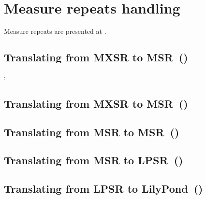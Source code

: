 
\chapter{Measure repeats handling}\label{Measure repeats handling}

Measure repeats are presented at .


\section{Translating from MXSR to MSR\ (\mxsrToMsr{})}

:


\section{Translating from MXSR to MSR\ (\mxsrToMsr{})}


\section{Translating from MSR to MSR\ (\msrToMsr{})}


\section{Translating from MSR to LPSR\ (\msrToLpsr{})}


\section{Translating from LPSR to LilyPond\ (\lpsrToLilypond{})}


